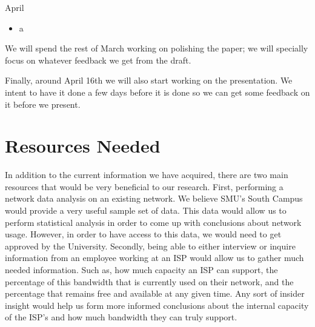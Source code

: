 \documentclass{sigcomm-alternate}
\begin{document}
April
\begin{itemize}
		\item a
\end{itemize}


		

	

	We will spend the rest of March working on polishing the paper; we will specially focus on whatever feedback we get from the draft. 
	
	Finally, around April 16th we will also start working on the presentation. We intent to have it done a few days before it is done so we can get some feedback on it before we present.  






\section{Resources Needed}
In addition to the current information we have acquired, there are two main resources that would be very beneficial to our research. First, performing a network data analysis on an existing network. We believe SMU's South Campus would provide a very useful sample set of data. This data would allow us to perform statistical analysis in order to come up with conclusions about network usage. However, in order to have access to this data, we would need to get approved by the University. Secondly, being able to either interview or inquire information from an employee working at an ISP would allow us to gather much needed information. Such as, how much capacity an ISP can support, the percentage of this bandwidth that is currently used on their network, and the percentage that remains free and available at any given time. Any sort of insider insight would help us form more informed conclusions about the internal capacity of the ISP's and how much bandwidth they can truly support.





\end{document}

